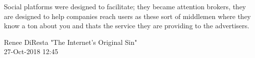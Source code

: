 \documentclass[aspectratio=169]{beamer}
\begin{document}
\begin{frame}
\frametitle{}
\epigraph{Social platforms were designed to facilitate; they became attention brokers, they are designed to help companies reach users as these sort of middlemen where they know a ton about you and thats the service they are providing to the advertisers.}{Renee DiResta "The Internet's Original Sin" \\ 27-Oct-2018 12:45}

\end{frame}
\end{document}
